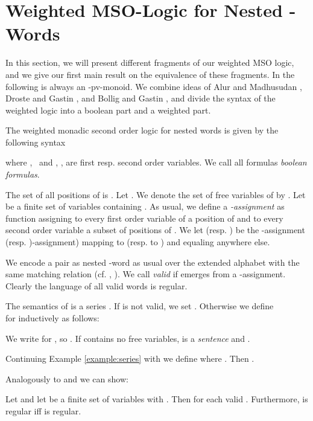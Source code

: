 \documentclass[runningheads, envcountsame, a4paper]{llncs}
\begin{document}
\section{Weighted MSO-Logic for Nested -Words} \label{kapMSOD}
In this section, we will present different fragments of our weighted MSO logic, and we give our first main result on the equivalence of these fragments. 
In the following  is always an -pv-monoid. We combine ideas of Alur and Madhusudan \cite{AM}, Droste and Gastin \cite{DG}, and Bollig and Gastin \cite{BG}, 
and divide the syntax of the weighted logic into a boolean part and a weighted part.
\begin{Def}[Syntax]
	The weighted monadic second order logic for nested words  is given by the following syntax
	
where ,~ and , ,  are first resp. second order variables. We call all formulas  \emph{boolean formulas}.
\end{Def}
The set of all positions of  is . Let . We denote the set of free variables of  by . Let  be a finite set of variables containing . As usual, we define a \emph{-assignment}  as function assigning to every first order variable of  a position of  and to every second order variable a subset of positions of .
We let
 (resp. ) be the -assignment (resp. )-assignment) mapping  to  (resp.  to ) and equaling  anywhere else. \par
We encode a pair  as nested -word as usual over the extended alphabet  with the same matching relation  (cf. \cite{DG}, \cite{DP}). We call  \emph{valid} if  emerges from a -assignment. Clearly the language  of all valid words is regular. \begin{Def}[Semantics]
\label{tab}
The semantics of  is a series . If  is not valid, we set . Otherwise we define \\  for  inductively as follows:
\begin{small}
	
	\vspace{-16pt}				
	\end{small}	\end{Def}
We write  for , so
	.
If  contains no free variables,  is a \emph{sentence} and
	.
\begin{example}
Continuing Example \ref{example:series} with  we define 
where . Then .
\end{example}
\par Analogously to \cite{DG} and \cite{DP} we can show:
\begin{Satz}
\label{prop:consistency}
	Let  and let  be a finite set of variables with . Then  for each valid . Furthermore,  is regular iff  is regular. 
\end{Satz}
\end{document}
